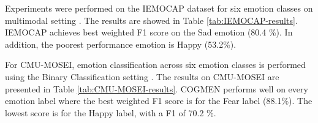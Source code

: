 Experiments were performed on the IEMOCAP dataset for six emotion classes on multimodal setting \cite{HP_Advanced}. The results are showed in Table \ref{tab:IEMOCAP-results}. IEMOCAP achieves best weighted F1 score on the Sad emotion (80.4 \%). In addition, the poorest performance emotion is Happy (53.2\%).
%
\begin{table}[h]
    \caption{Results on the IEMOCAP dataset (6-way). Avg. denotes the weighted average.}
    \centering
    \label{tab:IEMOCAP-results}
\end{table}
%
For CMU-MOSEI, emotion classification across six emotion classes is performed using the Binary Classification setting \cite{COGMEN_joshi-etal-2022-cogmen}. The results on CMU-MOSEI are presented in Table \ref{tab:CMU-MOSEI-results}. COGMEN performs well on every emotion label where the best weighted F1 score is for the Fear label (88.1\%). The lowest score is for the Happy label, with a F1 of 70.2 \%. 
%
\begin{table}[h]
    \caption{Results on the CMU-MOSEI dataset (6-emotion class). Avg. denotes the weighted average.}
    \centering
    \label{tab:CMU-MOSEI-results}
\end{table}
